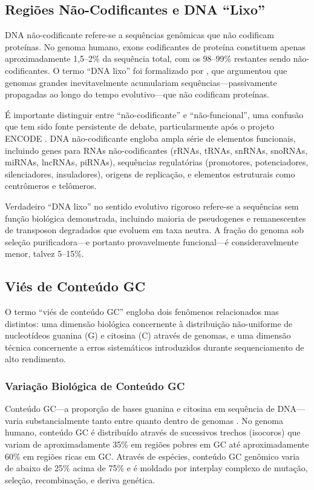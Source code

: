 \subsection{Regiões Não-Codificantes e DNA ``Lixo''}

DNA não-codificante refere-se a sequências genômicas que não codificam proteínas. No genoma humano, exons codificantes de proteína constituem apenas aproximadamente 1,5--2\% da sequência total, com os 98--99\% restantes sendo não-codificantes. O termo ``DNA lixo'' foi formalizado por \textcite{ohno1972}, que argumentou que genomas grandes inevitavelmente acumulariam sequências---passivamente propagadas ao longo do tempo evolutivo---que não codificam proteínas.

É importante distinguir entre ``não-codificante'' e ``não-funcional'', uma confusão que tem sido fonte persistente de debate, particularmente após o projeto ENCODE \parencite{encode2012,doolittle2013,graur2013}. DNA não-codificante engloba ampla série de elementos funcionais, incluindo genes para RNAs não-codificantes (rRNAs, tRNAs, snRNAs, snoRNAs, miRNAs, lncRNAs, piRNAs), sequências regulatórias (promotores, potenciadores, silenciadores, insuladores), origens de replicação, e elementos estruturais como centrômeros e telômeros.

Verdadeiro ``DNA lixo'' no sentido evolutivo rigoroso refere-se a sequências sem função biológica demonstrada, incluindo maioria de pseudogenes e remanescentes de transposon degradados que evoluem em taxa neutra. A fração do genoma sob seleção purificadora---e portanto provavelmente funcional---é consideravelmente menor, talvez 5--15\%.

\subsection{Viés de Conteúdo GC}

O termo ``viés de conteúdo GC'' engloba dois fenômenos relacionados mas distintos: uma dimensão biológica concernente à distribuição não-uniforme de nucleotídeos guanina (G) e citosina (C) através de genomas, e uma dimensão técnica concernente a erros sistemáticos introduzidos durante sequenciamento de alto rendimento.

\subsubsection{Variação Biológica de Conteúdo GC}

Conteúdo GC---a proporção de bases guanina e citosina em sequência de DNA---varia substancialmente tanto entre quanto dentro de genomas \parencite{benjamini2012}. No genoma humano, conteúdo GC é distribuído através de sucessivos trechos (isocoros) que variam de aproximadamente 35\% em regiões pobres em GC até aproximadamente 60\% em regiões ricas em GC. Através de espécies, conteúdo GC genômico varia de abaixo de 25\% acima de 75\% e é moldado por interplay complexo de mutação, seleção, recombinação, e deriva genética.

